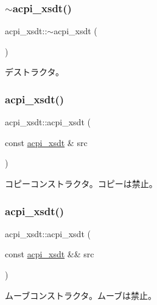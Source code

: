 \subsubsection{\texorpdfstring{$\sim$acpi\+\_\+xsdt()}{~acpi\_xsdt()}}
{\footnotesize\ttfamily acpi\+\_\+xsdt\+::$\sim$acpi\+\_\+xsdt (\begin{DoxyParamCaption}{ }\end{DoxyParamCaption})\hspace{0.3cm}{\ttfamily [virtual]}}

デストラクタ。 \hypertarget{classacpi__xsdt_a7774cba5774ac30d78c0a2c3ba181901}{}\label{classacpi__xsdt_a7774cba5774ac30d78c0a2c3ba181901} 
\subsubsection{\texorpdfstring{acpi\+\_\+xsdt()}{acpi\_xsdt()}\hspace{0.1cm}{\footnotesize\ttfamily [3/4]}}
{\footnotesize\ttfamily acpi\+\_\+xsdt\+::acpi\+\_\+xsdt (\begin{DoxyParamCaption}\item[{const \hyperlink{classacpi__xsdt}{acpi\+\_\+xsdt} \&}]{src }\end{DoxyParamCaption})\hspace{0.3cm}{\ttfamily [delete]}}

コピーコンストラクタ。コピーは禁止。 \hypertarget{classacpi__xsdt_a111850e71447f435e6dab860465772b4}{}\label{classacpi__xsdt_a111850e71447f435e6dab860465772b4} 
\subsubsection{\texorpdfstring{acpi\+\_\+xsdt()}{acpi\_xsdt()}\hspace{0.1cm}{\footnotesize\ttfamily [4/4]}}
{\footnotesize\ttfamily acpi\+\_\+xsdt\+::acpi\+\_\+xsdt (\begin{DoxyParamCaption}\item[{const \hyperlink{classacpi__xsdt}{acpi\+\_\+xsdt} \&\&}]{src }\end{DoxyParamCaption})\hspace{0.3cm}{\ttfamily [delete]}}

ムーブコンストラクタ。ムーブは禁止。 


